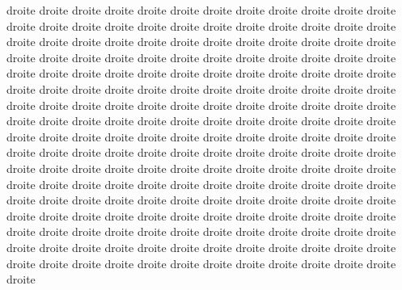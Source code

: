 \documentclass[12pt]{book}
\begin{document}
\begin{pages}
\begin{Rightside}
\beginnumbering
{}
droite droite droite droite droite droite droite droite droite droite droite droite droite droite droite droite droite droite droite droite droite droite droite droite droite droite droite droite droite droite droite droite droite droite droite droite droite droite droite droite droite droite droite droite droite droite droite droite droite droite droite droite droite droite droite droite droite droite droite droite droite droite droite droite droite droite droite droite droite droite droite droite droite droite droite droite droite droite droite droite droite droite 
\pend
{}
droite droite droite droite droite droite droite droite droite droite droite droite droite droite droite droite droite droite droite droite droite droite droite droite droite droite droite droite droite droite droite droite droite droite droite droite droite droite droite droite droite droite droite droite droite droite droite droite droite droite droite droite droite droite droite droite droite droite droite droite droite droite droite droite droite droite droite droite droite droite droite droite droite droite droite droite droite droite droite droite droite droite droite droite droite droite droite droite droite droite droite droite droite droite droite droite droite droite droite droite droite droite droite droite droite droite droite droite droite droite droite droite droite droite droite droite droite droite droite droite droite droite droite 
\pend
\endnumbering
\end{Rightside}

\end{pages}
\Pages
\end{document}
